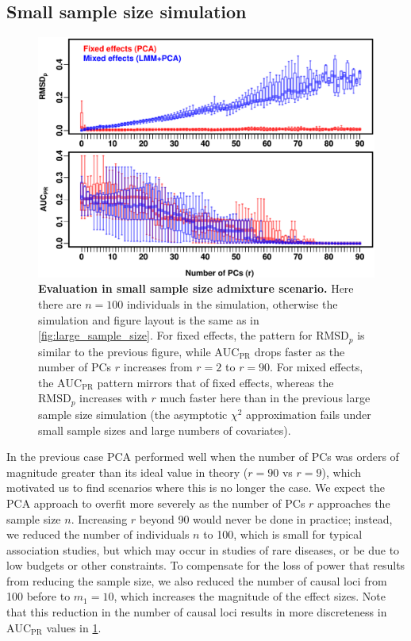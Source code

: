 \documentclass[11pt]{article}
\newcommand{\rmsd}{\text{RMSD}_p}
\newcommand{\auc}{\text{AUC}_\text{PR}}
\begin{document}
\subsection{Small sample size simulation}

\begin{figure}[bp!]
  \centering
  \includegraphics[width=6in]{PCA_data/PCA_GCTApcs/boxplot_n_100.pdf}
  \caption{
    {\bf Evaluation in small sample size admixture scenario.}
    Here there are $n = 100$ individuals in the simulation, otherwise the simulation and figure layout is the same as in \cref{fig:large_sample_size}.
    For fixed effects, the pattern for $\rmsd$ is similar to the previous figure, while $\auc$ drops faster as the number of PCs $r$ increases from $r=2$ to $r=90$.
    For mixed effects, the $\auc$ pattern mirrors that of fixed effects, whereas the $\rmsd$ increases with $r$ much faster here than in the previous large sample size simulation (the asymptotic $\chi^2$ approximation fails under small sample sizes and large numbers of covariates).
  }
  \label{fig:small_sample_size}
\end{figure}

In the previous case PCA performed well when the number of PCs was orders of magnitude greater than its ideal value in theory ($r = 90$ vs $r = 9$), which motivated us to find scenarios where this is no longer the case.
We expect the PCA approach to overfit more severely as the number of PCs $r$ approaches the sample size $n$.
Increasing $r$ beyond 90 would never be done in practice; 
instead, we reduced the number of individuals $n$ to 100, which is small for typical association studies, but which may occur in studies of rare diseases, or be due to low budgets or other constraints.
To compensate for the loss of power that results from reducing the sample size, we also reduced the number of causal loci from 100 before to $m_1 = 10$, which increases the magnitude of the effect sizes.
Note that this reduction in the number of causal loci results in more discreteness in $\auc$ values in \cref{fig:small_sample_size}.
\end{document}

